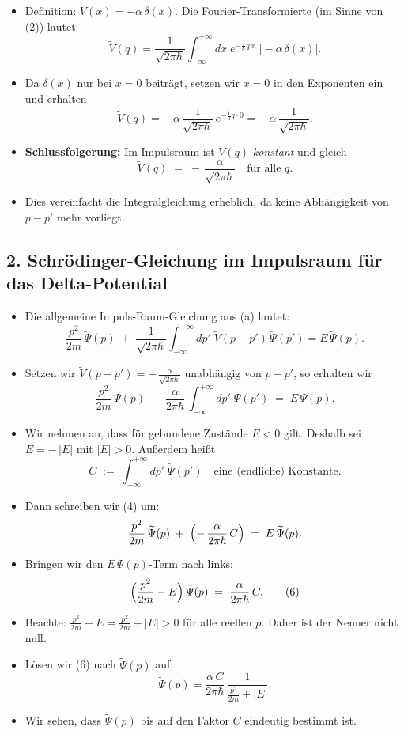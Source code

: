 \documentclass[12pt,a4paper]{scrartcl}
\begin{document}
\begin{itemize}
  \item Definition: $V(x) = -\alpha\,\delta(x)$. Die Fourier-Transformierte (im Sinne von (2)) lautet:
  \[
    \widetilde V(q)
    = \frac{1}{\sqrt{2\pi\hbar}} \int_{-\infty}^{+\infty} dx\; e^{-\frac{\mathrm{i}}{\hbar} q\,x}\; \bigl[-\alpha\,\delta(x)\bigr].
  \]
  \item Da $\delta(x)$ nur bei $x=0$ beiträgt, setzen wir $x=0$ in den Exponenten ein und erhalten
  \[
    \widetilde V(q) = -\,\alpha\,\frac{1}{\sqrt{2\pi\hbar}}\,e^{-\frac{\mathrm{i}}{\hbar} q\cdot 0}
    = -\,\alpha\,\frac{1}{\sqrt{2\pi\hbar}}.
  \]
  \item \textbf{Schlussfolgerung:} Im Impulsraum ist $ \widetilde V(q) $ \emph{konstant} und gleich
  \[
    \widetilde V(q) \;=\; -\,\frac{\alpha}{\sqrt{2\pi\hbar}} \quad\text{für alle }q.
  \]
  \item Dies vereinfacht die Integralgleichung erheblich, da keine Abhängigkeit von $p - p'$ mehr vorliegt.
\end{itemize}

\subsection*{2. Schrödinger-Gleichung im Impulsraum für das Delta-Potential}

\begin{itemize}
  \item Die allgemeine Impuls-Raum-Gleichung aus (a) lautet:
  \[
    \frac{p^2}{2m}\,\widetilde\Psi(p)
    \;+\; \frac{1}{\sqrt{2\pi\hbar}}\int_{-\infty}^{+\infty} dp'\;\widetilde V(p - p')\,\widetilde\Psi(p')
    = E\,\widetilde\Psi(p).
  \]
  \item Setzen wir $\widetilde V(p - p') = -\,\frac{\alpha}{\sqrt{2\pi\hbar}}$ unabhängig von $p-p'$, so erhalten wir
  \[
    \frac{p^2}{2m}\,\widetilde\Psi(p)
    \;-\; \frac{\alpha}{2\pi\hbar}\,\int_{-\infty}^{+\infty} dp'\;\widetilde\Psi(p')
    \;=\; E\,\widetilde\Psi(p).
    \tag{4}
  \]
  \item Wir nehmen an, dass für gebundene Zustände $E<0$ gilt. Deshalb sei $E=-\,|E|$ mit $|E|>0$. Außerdem heißt 
  \[
     C \;:=\; \int_{-\infty}^{+\infty} dp'\;\widetilde\Psi(p')
     \quad
     \text{eine (endliche) Konstante.}
     \tag{5}
  \]
  \item Dann schreiben wir (4) um:
  \[
    \frac{p^2}{2m}\,\widetilde\Psi(p) \;+\; \Bigl(-\,\frac{\alpha}{2\pi\hbar}\,C\Bigr) \;=\; E\,\widetilde\Psi(p).
  \]
  \item Bringen wir den $E\,\widetilde\Psi(p)$-Term nach links:
  \[
    \Bigl(\frac{p^2}{2m} - E\Bigr)\,\widetilde\Psi(p) 
    \;=\; \frac{\alpha}{2\pi\hbar}\,C.
    \tag{6}
  \]
  \item Beachte: $\frac{p^2}{2m} - E = \frac{p^2}{2m} + |E| > 0$ für alle reellen $p$. Daher ist der Nenner nicht null.
  \item Lösen wir (6) nach $\widetilde\Psi(p)$ auf:
  \[
    \widetilde\Psi(p)
    = \frac{\alpha\,C}{2\pi\hbar}\,\frac{1}{\frac{p^2}{2m} + |E|}.
    \tag{7}
  \]
  \item Wir sehen, dass $\widetilde\Psi(p)$ bis auf den Faktor $C$ eindeutig bestimmt ist.
\end{itemize}
\end{document}
